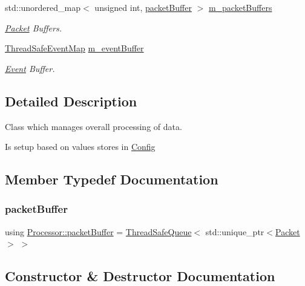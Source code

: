 \begin{DoxyCompactItemize}
std\+::unordered\+\_\+map$<$ unsigned int, \hyperlink{class_processor_a0cfd8ed0721769db91c142a19a392e0f}{packet\+Buffer} $>$ \hyperlink{class_processor_ab75c789ec03e38e8621f000332daa285}{m\+\_\+packet\+Buffers}
\begin{DoxyCompactList}\small\item\em \hyperlink{class_packet}{Packet} Buffers. \end{DoxyCompactList}\item 
\hyperlink{class_thread_safe_event_map}{Thread\+Safe\+Event\+Map} \hyperlink{class_processor_a7cb15fbab19fceb6bc5a607629ff5040}{m\+\_\+event\+Buffer}
\begin{DoxyCompactList}\small\item\em \hyperlink{class_event}{Event} Buffer. \end{DoxyCompactList}\end{DoxyCompactItemize}


\subsection{Detailed Description}
Class which manages overall processing of data. 

Is setup based on values stores in \hyperlink{class_config}{Config} 

\subsection{Member Typedef Documentation}
\mbox{\label{class_processor_a0cfd8ed0721769db91c142a19a392e0f}} 
\subsubsection{\texorpdfstring{packet\+Buffer}{packetBuffer}}
{\footnotesize\ttfamily using \hyperlink{class_processor_a0cfd8ed0721769db91c142a19a392e0f}{Processor\+::packet\+Buffer} =  \hyperlink{class_thread_safe_queue}{Thread\+Safe\+Queue}$<$ std\+::unique\+\_\+ptr$<$\hyperlink{class_packet}{Packet}$>$ $>$\hspace{0.3cm}{\ttfamily [private]}}



\subsection{Constructor \& Destructor Documentation}
\mbox{\label{class_processor_a1cc4421ebb02f40665336598c1334c55}} 
